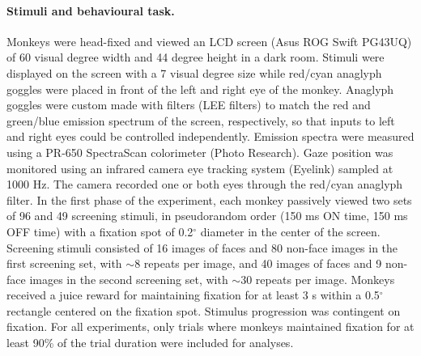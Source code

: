 \documentclass{article}
\begin{document}
\paragraph{Stimuli and behavioural task.} Monkeys were head-fixed and viewed an LCD screen (Asus ROG Swift PG43UQ) of 60 visual degree width and 44 degree height in a dark room. Stimuli were displayed on the screen with a 7 visual degree size while red/cyan anaglyph goggles were placed in front of the left and right eye of the monkey. Anaglyph goggles were custom made with filters (LEE filters) to match the red and green/blue emission spectrum of the screen, respectively, so that inputs to left and right eyes could be controlled independently. Emission spectra were measured using a PR-650 SpectraScan colorimeter (Photo Research). Gaze position was monitored using an infrared camera eye tracking system (Eyelink) sampled at 1000 Hz. The camera recorded one or both eyes through the red/cyan anaglyph filter. In the first phase of the experiment, each monkey passively viewed two sets of 96 and 49 screening stimuli, in pseudorandom order (150 ms ON time, 150 ms OFF time) with a fixation spot of 0.2$^\circ$ diameter in the center of the screen. Screening stimuli consisted of 16 images of faces and 80 non-face images in the first screening set, with ${\sim}8$ repeats per image, and 40 images of faces and 9 non-face images in the second screening set, with ${\sim}30$ repeats per image. Monkeys received a juice reward for maintaining fixation for at least 3 s within a 0.5$^\circ$ rectangle centered on the fixation spot. Stimulus progression was contingent on fixation. For all experiments, only trials where monkeys maintained fixation for at least 90\% of the trial duration were included for analyses.
\end{document}
